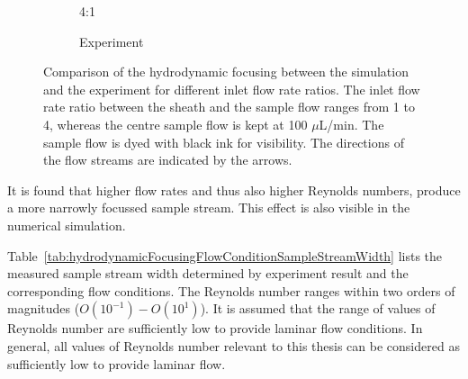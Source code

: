 \begin{figure}[htb!]
\begin{subfigure}[b]{0.4\textwidth}
				\caption{4:1}
                \caption*{Experiment}
    \end{subfigure}         
	\caption[Hydrodynamic focusing comparison between simulations and experiments]{Comparison of the hydrodynamic focusing between the simulation and the experiment for different inlet flow rate ratios. The inlet flow rate ratio between the sheath and the sample flow ranges from 1 to 4, whereas the centre sample flow is kept at 100 $\mu$L/min. The sample flow is dyed with black ink for visibility. The directions of the flow streams are indicated by the arrows.}
        \label{fig:hydrodynamicFocusingSimulationAndExperiments}
\end{figure}

It is found that higher flow rates and thus also higher Reynolds numbers, produce a more narrowly focussed sample stream. This effect is also visible in the numerical simulation. 

Table~\ref{tab:hydrodynamicFocusingFlowConditionSampleStreamWidth} lists the measured sample stream width determined by experiment result and the corresponding flow conditions. The Reynolds number ranges within two orders of magnitudes ($O(10^{-1})-O(10^{1})$). It is assumed that the range of values of Reynolds number are sufficiently low to provide laminar flow conditions. In general, all values of Reynolds number relevant to this thesis can be considered as sufficiently low to provide laminar flow.

